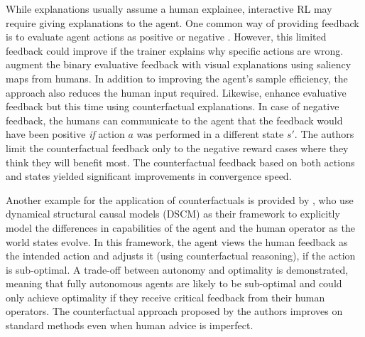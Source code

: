 \documentclass[twoside,11pt]{article}
\begin{document}
\begin{enumerate}
While explanations usually assume a human explainee, interactive RL may require giving explanations to the agent. One common way of providing feedback is to evaluate agent actions as positive or negative \citep{arakawa:18,Knox:2008:TAMER,knox:13,macglashan2017interactive}. However, this limited feedback could improve if the trainer explains why specific actions are wrong. \citet{guan2020explanation} augment the binary evaluative feedback with visual explanations using saliency maps from humans. In addition to improving the agent's sample efficiency, the approach also reduces the human input required.  Likewise, \citet{Karalus:2021:HITL-counterfactuals} enhance evaluative feedback but this time using counterfactual explanations. In case of negative feedback, the humans can communicate to the agent that the feedback would have been positive \emph{if} action $a$ was performed in a different state $s'$. The authors limit the counterfactual feedback only to the negative reward cases where they think they will benefit most. The counterfactual feedback based on both actions and states yielded significant improvements in convergence speed. 

Another example for the application of counterfactuals is provided by \citet{Pearl:2009:Causality}, who use dynamical structural causal models (DSCM) as their framework to explicitly model the differences in capabilities of the agent and the human operator as the world states evolve. In this framework, the agent views the human feedback as the intended action and adjusts it (using counterfactual reasoning), if the action is sub-optimal. A trade-off between autonomy and optimality is demonstrated, meaning that fully autonomous agents are likely to be sub-optimal and could only achieve optimality if they receive critical feedback from their human operators. The counterfactual approach proposed by the authors improves on standard methods even when human advice is imperfect.


\end{enumerate}
\end{document}
